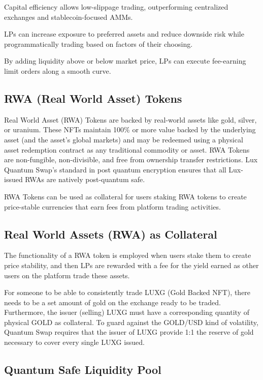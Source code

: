 \documentclass[11pt]{article}
\begin{document}
Capital efficiency allows low-slippage trading, outperforming centralized exchanges and stablecoin-focused AMMs.


LPs can increase exposure to preferred assets and reduce downside risk while programmatically trading based on factors of their choosing.


By adding liquidity above or below market price, LPs can execute fee-earning limit orders along a smooth curve.


\subsection{RWA (Real World Asset) Tokens}

Real World Asset (RWA) Tokens are backed by real-world assets like gold, silver, or uranium. These NFTs maintain 100\% or more value backed by the underlying asset (and the asset's global markets) and may be redeemed using a physical asset redemption contract as any traditional commodity or asset. RWA Tokens are non-fungible, non-divisible, and free from ownership transfer restrictions. Lux Quantum Swap's standard in post quantum encryption ensures that all Lux-issued RWAs are natively post-quantum safe.


RWA Tokens can be used as collateral for users staking RWA tokens to create price-stable currencies that earn fees from platform trading activities.


\subsection{Real World Assets (RWA) as Collateral}

The functionality of a RWA token is employed when users stake them to create price stability, and then LPs are rewarded with a fee for the yield earned as other users on the platform trade these assets.


For someone to be able to consistently trade LUXG (Gold Backed NFT), there needs to be a set amount of gold on the exchange ready to be traded. Furthermore, the issuer (selling) LUXG must have a corresponding quantity of physical GOLD as collateral. To guard against the GOLD/USD kind of volatility, Quantum Swap requires that the issuer of LUXG provide 1:1 the reserve of gold necessary to cover every single LUXG issued.


\subsection{Quantum Safe Liquidity Pool}
\end{document}
